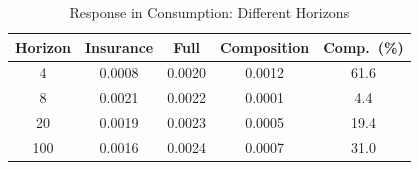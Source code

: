 \begin{table}[htbp]\centering
\caption{Response in Consumption: Different Horizons}
\label{tab:response_consump}
\begin{tabular}{ccccc}
\toprule
 Horizon & Insurance & Full & Composition & Comp.\ (\%) \\\midrule
 4 & 0.0008 & 0.0020 & 0.0012 & 61.6 \\
 8 & 0.0021 & 0.0022 & 0.0001 & 4.4 \\
 20 & 0.0019 & 0.0023 & 0.0005 & 19.4 \\
 100 & 0.0016 & 0.0024 & 0.0007 & 31.0 \\
\bottomrule
\end{tabular}
\end{table}
